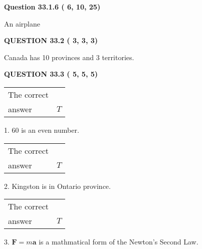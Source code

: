 \documentclass[12pt]{article}
\begin{document}
{\textbf{\Large{Question
33.1.6 
 (          6,         10,         25)
}}}
  
  
 
 
\noindent{}
 
 
An airplane
 
 
 
 
  
\vspace{0.2in}
  
{\textbf{\Large{QUESTION
33.2 
 (          3,          3,          3)
}}}
  
  
 
 
\noindent{}
 
 
Canada has  %
10 provinces and  %
3 territories.
 
 
 
 
  
\vspace{0.2in}
  
{\textbf{\Large{QUESTION
33.3 
 (          5,          5,          5)
}}}
  
  
 
 
\noindent{}

 
\noindent\begin{tabular}{|l|l|}\hline The correct & \\
          answer &  %
$T$ \\ \hline \end{tabular}
1. $ %
60$ is an  %
even number.
 
\noindent\begin{tabular}{|l|l|}\hline The correct & \\
          answer &  %
$T$ \\ \hline \end{tabular}
2.  %
Kingston is in  %
Ontario province.
 
\noindent\begin{tabular}{|l|l|}\hline The correct & \\
          answer &  %
$T$ \\ \hline \end{tabular}
3.  %
$\mathbf{F}=m\mathbf{a}$ is a mathmatical form of  %
the Newton's Second Law.
 
 
 
\end{document}
